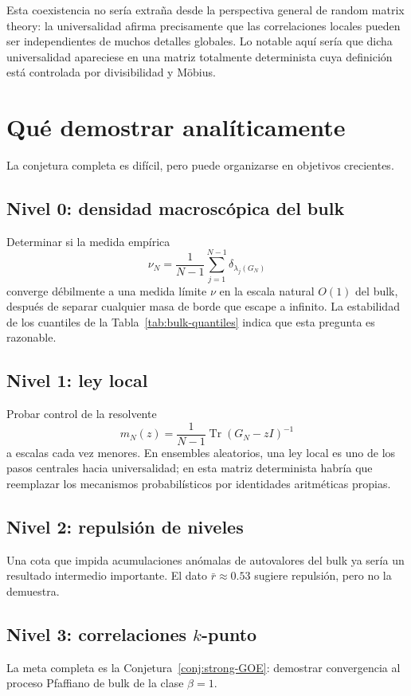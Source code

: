 \documentclass[11pt,a4paper]{article}
\newcommand{\Tr}{\operatorname{Tr}}
\begin{document}
Esta coexistencia no sería extraña desde la perspectiva general de random matrix theory: la universalidad afirma precisamente que las correlaciones locales pueden ser independientes de muchos detalles globales. Lo notable aquí sería que dicha universalidad apareciese en una matriz totalmente determinista cuya definición está controlada por divisibilidad y Möbius.

\section{Qué demostrar analíticamente}

La conjetura completa es difícil, pero puede organizarse en objetivos crecientes.

\subsection{Nivel 0: densidad macroscópica del bulk}
Determinar si la medida empírica
\begin{equation}
\nu_N=\frac1{N-1}\sum_{j=1}^{N-1}\delta_{\lambda_j(G_N)}
\end{equation}
converge débilmente a una medida límite $\nu$ en la escala natural $O(1)$ del bulk, después de separar cualquier masa de borde que escape a infinito. La estabilidad de los cuantiles de la Tabla~\ref{tab:bulk-quantiles} indica que esta pregunta es razonable.

\subsection{Nivel 1: ley local}
Probar control de la resolvente
\begin{equation}
m_N(z)=\frac1{N-1}\Tr(G_N-zI)^{-1}
\end{equation}
a escalas cada vez menores. En ensembles aleatorios, una ley local es uno de los pasos centrales hacia universalidad; en esta matriz determinista habría que reemplazar los mecanismos probabilísticos por identidades aritméticas propias.

\subsection{Nivel 2: repulsión de niveles}
Una cota que impida acumulaciones anómalas de autovalores del bulk ya sería un resultado intermedio importante. El dato $\bar r\approx0.53$ sugiere repulsión, pero no la demuestra.

\subsection{Nivel 3: correlaciones $k$-punto}
La meta completa es la Conjetura~\ref{conj:strong-GOE}: demostrar convergencia al proceso Pfaffiano de bulk de la clase $\beta=1$.
\end{document}

